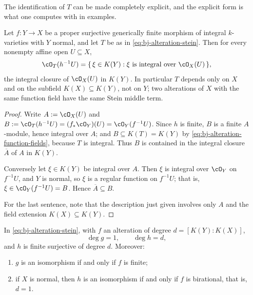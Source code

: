 The identification of $T$ can be made completely explicit, and the explicit
form is what one computes with in examples.

\begin{lemma}
\label{lem:ch42-middle-normalization}
Let $f:Y\to X$ be a proper surjective generically finite morphism of
integral $k$-varieties with $Y$ normal, and let $T$ be as in
\eqref{eq:bj-alteration-stein}.  Then for every nonempty affine open
$U\subseteq X$,
\[
 \cO_T(h^{-1}U)
 =\{\,\xi\in K(Y):\xi\ \text{is integral over}\ \cO_X(U)\,\},
\]
the integral closure of $\cO_X(U)$ in $K(Y)$.  In particular $T$
depends only on $X$ and on the subfield $K(X)\subseteq K(Y)$, not on
$Y$; two alterations of $X$ with the same function field have the same
Stein middle term.
\end{lemma}

\begin{proof}
Write $A:=\cO_X(U)$ and $B:=\cO_T(h^{-1}U)=(f_*\cO_Y)(U)
=\cO_Y(f^{-1}U)$.  Since $h$ is finite, $B$ is a finite $A$-module,
hence integral over $A$; and $B\subseteq K(T)=K(Y)$ by
\eqref{eq:bj-alteration-function-fields}, because $T$ is integral.  Thus
$B$ is contained in the integral closure $\overline A$ of $A$ in
$K(Y)$.

Conversely let $\xi\in K(Y)$ be integral over $A$.  Then $\xi$ is
integral over $\cO_Y$ on $f^{-1}U$, and $Y$ is normal, so $\xi$ is a
regular function on $f^{-1}U$; that is, $\xi\in\cO_Y(f^{-1}U)=B$.  Hence
$\overline A\subseteq B$.

For the last sentence, note that the description just given involves only
$A$ and the field extension $K(X)\subseteq K(Y)$.
\end{proof}

\begin{lemma}
\label{lem:ch42-h-degree}
In \eqref{eq:bj-alteration-stein}, with $f$ an alteration of degree
$d=[K(Y):K(X)]$,
\[
 \deg g=1,\qquad \deg h=d,
\]
and $h$ is finite surjective of degree $d$.  Moreover:
\begin{enumerate}
\item\label{itm:ch42-hd:g-iso} $g$ is an isomorphism if and only if $f$
      is finite;
\item\label{itm:ch42-hd:h-iso} if $X$ is normal, then $h$ is an
      isomorphism if and only if $f$ is birational, that is, $d=1$.
\end{enumerate}
\end{lemma}

